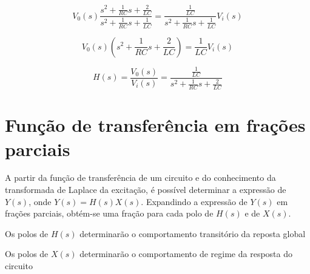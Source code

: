 \documentclass[12pt,fleqn]{book} %
\begin{document}
\begin{equation}
V_0(s)\frac{s^2+\frac{1}{RC}s+\frac{2}{LC}}{s^2+\frac{1}{RC}s+\frac{1}{LC}} = \frac{\frac{1}{LC}}{s^2+\frac{1}{RC}s+\frac{1}{LC}}V_i(s)
\end{equation}

\begin{equation}
V_0(s)(s^2+\frac{1}{RC}s+\frac{2}{LC}) = \frac{1}{LC}V_i(s)
\end{equation}

\begin{equation}
H(s) = \frac{V_0(s)}{V_i(s)} = \frac{\frac{1}{LC}}{s^2+\frac{1}{RC}s+\frac{2}{LC}}
\end{equation}
    
    
    
    \section{Função de transferência em frações parciais}
    
    A partir da função de transferência de um circuito e do conhecimento da transformada de Laplace da excitação, é possível determinar a expressão de $Y(s)$, onde $Y(s)=H(s)X(s)$. Expandindo a expressão de $Y(s)$ em frações parciais, obtém-se uma fração para cada polo de $H(s)$ e de $X(s)$.
    
    \begin{remark}
    Os polos de $H(s)$ determinarão o comportamento transitório da reposta global
    \end{remark}
    
    \begin{remark}
    Os polos de $X(s)$ determinarão o comportamento de regime da resposta do circuito
    \end{remark}
    
\end{document}
